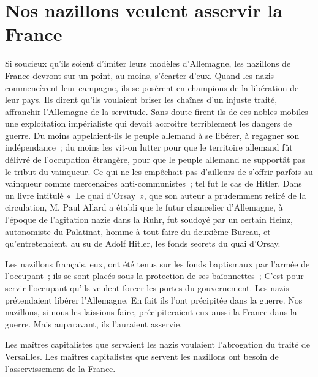 \documentclass[french,twoside]{book} %
\begin{document}
\section[Nos nazillons veulent asservir la France]{Nos nazillons veulent asservir la France}
\noindent Si soucieux qu’ils soient d’imiter leurs modèles d’Allemagne, les nazillons de France devront sur un point, au moins, s’écarter d’eux. Quand les nazis commencèrent leur campagne, ils se posèrent en champions de la libération de leur pays. Ils dirent qu’ils voulaient briser les chaînes d’un injuste traité, affranchir l’Allemagne de la servitude. Sans doute firent-ils de ces nobles mobiles une exploitation impérialiste qui devait accroitre terriblement les dangers de guerre. Du moins appelaient-ils le peuple allemand à se libérer, à regagner son indépendance ; du moins les vit-on lutter pour que le territoire allemand fût délivré de l’occupation étrangère, pour que le peuple allemand ne supportât pas le tribut du vainqueur. Ce qui ne les empêchait pas d’ailleurs de s’offrir parfois au vainqueur comme mercenaires anti-communistes ; tel fut le cas de Hitler. Dans un livre intitulé « Le quai d’Orsay », que son auteur a prudemment retiré de la circulation, M. Paul Allard a établi que le futur chancelier d’Allemagne, à l’époque de l’agitation nazie dans la Ruhr, fut soudoyé par un certain Heinz, autonomiste du Palatinat, homme à tout faire du deuxième Bureau, et qu’entretenaient, au su de Adolf Hitler, les fonds secrets du quai d’Orsay.\par
Les nazillons français, eux, ont été tenus sur les fonds baptismaux par l’armée de l’occupant ; ils se sont placés sous la protection de ses baïonnettes ; C’est pour servir l’occupant qu’ils veulent forcer les portes du gouvernement. Les nazis prétendaient libérer l’Allemagne. En fait ils l’ont précipitée dans la guerre. Nos nazillons, si nous les laissions faire, précipiteraient eux aussi la France dans la guerre. Mais auparavant, ils l’auraient asservie.\par
Les maîtres capitalistes que servaient les nazis voulaient l’abrogation du traité de Versailles. Les maîtres capitalistes que servent les nazillons ont besoin de l’asservissement de la France.
\end{document}
